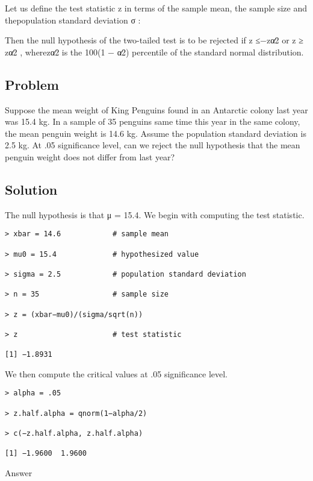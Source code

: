 Let us define the test statistic z in terms of the sample mean, the sample size and thepopulation standard deviation σ :



Then the null hypothesis of the two-tailed test is to be rejected if z ≤−zα∕2 or z ≥ zα∕2 , wherezα∕2 is the 100(1 − α∕2) percentile of the standard normal distribution.

\subsection{Problem}

Suppose the mean weight of King Penguins found in an Antarctic colony last year was 15.4 kg. In a sample of 35 penguins same time this year in the same colony, the mean penguin weight is 14.6 kg. Assume the population standard deviation is 2.5 kg. At .05 significance level, can we reject the null hypothesis that the mean penguin weight does not differ from last year?

\subsection{Solution}

The null hypothesis is that μ = 15.4. We begin with computing the test statistic.

\begin{framed}
\begin{verbatim}
> xbar = 14.6            # sample mean 

> mu0 = 15.4             # hypothesized value 

> sigma = 2.5            # population standard deviation 

> n = 35                 # sample size 

> z = (xbar−mu0)/(sigma/sqrt(n)) 

> z                      # test statistic 

[1] −1.8931
\end{verbatim}
\end{framed}
We then compute the critical values at .05 significance level.

\begin{framed}
\begin{verbatim}
> alpha = .05 

> z.half.alpha = qnorm(1−alpha/2) 

> c(−z.half.alpha, z.half.alpha) 

[1] −1.9600  1.9600
\end{verbatim}
\end{framed}
Answer

